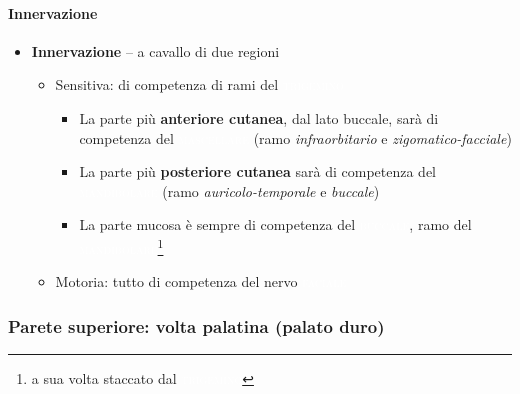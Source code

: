\documentclass[italian,]{article}
\providecommand{\tightlist}{%
  \setlength{\itemsep}{0pt}\setlength{\parskip}{0pt}}
\newcommand{\ner}[1]{\colorbox{Dandelion}{\textcolor{white}{\textsc{#1}}}}
\begin{document}
\hypertarget{innervazione}{%
\paragraph{Innervazione}\label{innervazione}}

\begin{itemize}
\tightlist
\item
  \textbf{Innervazione} -- a cavallo di due regioni

  \begin{itemize}
  \tightlist
  \item
    Sensitiva: di competenza di rami del \ner{trigemino}

    \begin{itemize}
    \tightlist
    \item
      La parte più \textbf{anteriore cutanea}, dal lato buccale, sarà di
      competenza del \ner{mascellare} (ramo \emph{infraorbitario} e
      \emph{zigomatico-facciale})
    \item
      La parte più \textbf{posteriore cutanea} sarà di competenza del
      \ner{mandibolare} (ramo \emph{auricolo-temporale} e
      \emph{buccale})
    \item
      La parte mucosa è sempre di competenza del \ner{buccale}, ramo del
      \ner{mandibolare}\footnote{a sua volta staccato dal
        \ner{trigemino}}
    \end{itemize}
  \item
    Motoria: tutto di competenza del nervo \ner{faciale}
  \end{itemize}
\end{itemize}

\hypertarget{parete-superiore-volta-palatina-palato-duro}{%
\subsubsection{Parete superiore: volta palatina (palato
duro)}\label{parete-superiore-volta-palatina-palato-duro}}
\end{document}
